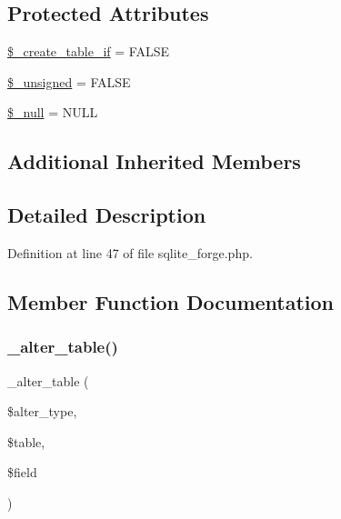 \subsection*{Protected Attributes}
\begin{DoxyCompactItemize}
\item 
\mbox{\hyperlink{class_c_i___d_b__sqlite__forge_a2f6484fcb8d1dc3eef67a637227cd583}{\$\+\_\+create\+\_\+table\+\_\+if}} = F\+A\+L\+SE
\item 
\mbox{\hyperlink{class_c_i___d_b__sqlite__forge_aae977ae6d61fa183f0b25422b6ddc31c}{\$\+\_\+unsigned}} = F\+A\+L\+SE
\item 
\mbox{\hyperlink{class_c_i___d_b__sqlite__forge_ae58fe6a5104d4a069a49b27533ce808f}{\$\+\_\+null}} = \textquotesingle{}N\+U\+LL\textquotesingle{}
\end{DoxyCompactItemize}
\subsection*{Additional Inherited Members}


\subsection{Detailed Description}


Definition at line 47 of file sqlite\+\_\+forge.\+php.



\subsection{Member Function Documentation}
\mbox{\label{class_c_i___d_b__sqlite__forge_a41c6cae02f2fda8b429ad0afb9509426}} 
\subsubsection{\texorpdfstring{\_alter\_table()}{\_alter\_table()}}
{\footnotesize\ttfamily \+\_\+alter\+\_\+table (\begin{DoxyParamCaption}\item[{}]{\$alter\+\_\+type,  }\item[{}]{\$table,  }\item[{}]{\$field }\end{DoxyParamCaption})\hspace{0.3cm}{\ttfamily [protected]}}

